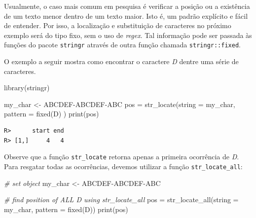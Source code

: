 \documentclass[
  11pt,
]{book}
\newenvironment{Shaded}{\begin{snugshade}}{\end{snugshade}}
\newcommand{\AttributeTok}[1]{\textcolor[rgb]{0.61,0.61,0.61}{#1}}
\newcommand{\CommentTok}[1]{\textcolor[rgb]{0.37,0.37,0.37}{\textit{#1}}}
\newcommand{\FunctionTok}[1]{\textcolor[rgb]{0,0,0}{#1}}
\newcommand{\NormalTok}[1]{#1}
\newcommand{\OtherTok}[1]{\textcolor[rgb]{0.37,0.37,0.37}{#1}}
\newcommand{\StringTok}[1]{\textcolor[rgb]{0.5,0.5,0.5}{#1}}
\begin{document}
Usualmente, o caso mais comum em pesquisa é verificar a posição ou a existência de um texto menor dentro de um texto maior. Isto é, um padrão explícito e fácil de entender. Por isso, a localização e substituição de caracteres no próximo exemplo será do tipo fixo, sem o uso de \emph{regex}. Tal informação pode ser passada às funções do pacote \texttt{stringr} através de outra função chamada \texttt{stringr::fixed}. 

O exemplo a seguir mostra como encontrar o caractere \emph{D} dentre uma série de caracteres.

\begin{Shaded}
\begin{Highlighting}[]
\FunctionTok{library}\NormalTok{(stringr)}

\NormalTok{my\_char }\OtherTok{\textless{}{-}} \StringTok{\textquotesingle{}ABCDEF{-}ABCDEF{-}ABC\textquotesingle{}}
\NormalTok{pos }\OtherTok{=} \FunctionTok{str\_locate}\NormalTok{(}\AttributeTok{string =}\NormalTok{ my\_char, }\AttributeTok{pattern =} \FunctionTok{fixed}\NormalTok{(}\StringTok{\textquotesingle{}D\textquotesingle{}}\NormalTok{) )}
\FunctionTok{print}\NormalTok{(pos)}
\end{Highlighting}
\end{Shaded}

\begin{verbatim}
R>      start end
R> [1,]     4   4
\end{verbatim}

Observe que a função \texttt{str\_locate} retorna apenas a primeira ocorrência de \emph{D}. Para resgatar todas as ocorrências, devemos utilizar a função \texttt{str\_locate\_all}:

\begin{Shaded}
\begin{Highlighting}[]
\CommentTok{\# set object}
\NormalTok{my\_char }\OtherTok{\textless{}{-}} \StringTok{\textquotesingle{}ABCDEF{-}ABCDEF{-}ABC\textquotesingle{}}

\CommentTok{\# find position of ALL \textquotesingle{}D\textquotesingle{} using str\_locate\_all}
\NormalTok{pos }\OtherTok{=} \FunctionTok{str\_locate\_all}\NormalTok{(}\AttributeTok{string =}\NormalTok{ my\_char, }\AttributeTok{pattern =} \FunctionTok{fixed}\NormalTok{(}\StringTok{\textquotesingle{}D\textquotesingle{}}\NormalTok{))}
\FunctionTok{print}\NormalTok{(pos)}
\end{Highlighting}
\end{Shaded}
\end{document}
